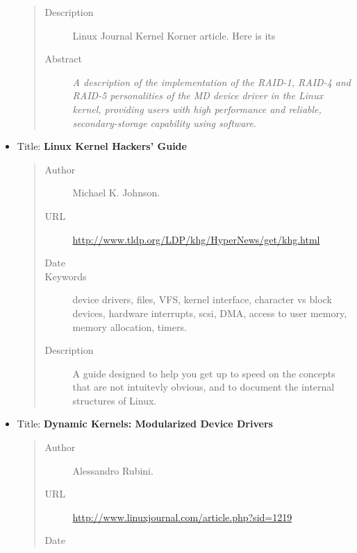 \documentclass[a4paper,8pt,english]{sphinxmanual}
\begin{document}
\begin{itemize}
\begin{quote}
\begin{description}
\item[{Description}] \leavevmode
Linux Journal Kernel Korner article. Here is its

\item[{Abstract}] \leavevmode
\emph{A description of the implementation of the RAID-1,
RAID-4 and RAID-5 personalities of the MD device driver in the
Linux kernel, providing users with high performance and reliable,
secondary-storage capability using software}.

\end{description}\end{quote}

\item {} 
Title: \textbf{Linux Kernel Hackers' Guide}
\begin{quote}\begin{description}
\item[{Author}] \leavevmode
Michael K. Johnson.

\item[{URL}] \leavevmode
\href{http://www.tldp.org/LDP/khg/HyperNews/get/khg.html}{http://www.tldp.org/LDP/khg/HyperNews/get/khg.html}

\item[{Date}] 

\item[{Keywords}] \leavevmode
device drivers, files, VFS, kernel interface, character vs
block devices, hardware interrupts, scsi, DMA, access to user memory,
memory allocation, timers.

\item[{Description}] \leavevmode
A guide designed to help you get up to speed on the
concepts that are not intuitevly obvious, and to document the internal
structures of Linux.

\end{description}\end{quote}

\item {} 
Title: \textbf{Dynamic Kernels: Modularized Device Drivers}
\begin{quote}\begin{description}
\item[{Author}] \leavevmode
Alessandro Rubini.

\item[{URL}] \leavevmode
\href{http://www.linuxjournal.com/article.php?sid=1219}{http://www.linuxjournal.com/article.php?sid=1219}

\item[{Date}] 


\end{description}
\end{quote}
\end{itemize}
\end{document}
